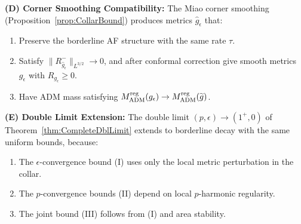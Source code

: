 \begin{theorem}
\textbf{(D) Corner Smoothing Compatibility:}
The Miao corner smoothing (Proposition~\ref{prop:CollarBound}) produces metrics $\hat{g}_\epsilon$ that:
\begin{enumerate}
    \item Preserve the borderline AF structure with the same rate $\tau$.
    \item Satisfy $\|R^-_{\hat{g}_\epsilon}\|_{L^{3/2}} \to 0$, and after conformal correction give smooth metrics $g_\epsilon$ with $R_{g_\epsilon}\ge0$.
    \item Have ADM mass satisfying $M_{\mathrm{ADM}}^{\mathrm{reg}}(g_\epsilon) \to M_{\mathrm{ADM}}^{\mathrm{reg}}(\widetilde{g})$.
\end{enumerate}

\textbf{(E) Double Limit Extension:}
The double limit $(p, \epsilon) \to (1^+, 0)$ of Theorem~\ref{thm:CompleteDblLimit} extends to borderline decay with the same uniform bounds, because:
\begin{enumerate}
    \item The $\epsilon$-convergence bound (I) uses only the local metric perturbation in the collar.
    \item The $p$-convergence bounds (II) depend on local $p$-harmonic regularity.
    \item The joint bound (III) follows from (I) and area stability.
\end{enumerate}
\end{theorem}


